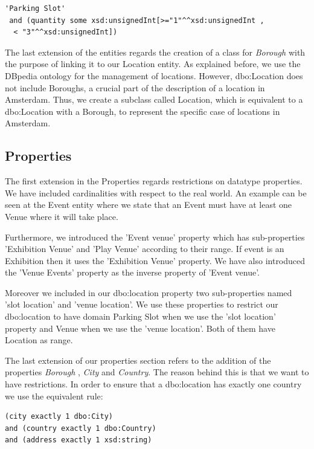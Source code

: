 \documentclass[runningheads,a4paper]{../../StyleFiles/llncs}
\begin{document}
\begin{lstlisting}[captionpos=b, caption=Definition of Small Slot a subclass of Parking Slot, label=lst:owl, basicstyle=\ttfamily\small,frame=bt,showstringspaces=false]
'Parking Slot' 
 and (quantity some xsd:unsignedInt[>="1"^^xsd:unsignedInt ,
  < "3"^^xsd:unsignedInt])
\end{lstlisting}

The last extension of the entities regards the creation of a class for \textit{Borough} with the purpose of linking it to our Location entity. As explained before, we use the DBpedia ontology for the management of locations. However, dbo:Location does not include Boroughs, a crucial part of the description of a  location in Amsterdam. Thus, we create a subclass called Location, which is equivalent to a dbo:Location with a Borough, to represent the specific case of locations in Amsterdam.

\subsection{Properties}

The first extension in the Properties regards restrictions on datatype properties. We have included cardinalities with respect to the real world. An example can be seen at the Event entity where we state that an Event must have at least one Venue where it will take place.

Furthermore, we introduced the 'Event venue' property which has sub-properties 'Exhibition Venue' and 'Play Venue' according to their range. If event is an Exhibition then it uses the 'Exhibition Venue' property. We have also introduced the 'Venue Events' property as the inverse property of 'Event venue'. 

Moreover we included in our dbo:location property two sub-properties named 'slot location' and 'venue location'. We use these properties to restrict our dbo:location to have domain Parking Slot when we use the 'slot location' property and Venue when we use the 'venue location'. Both of them have Location as range.

The last extension of our properties section refers to the addition of the properties \textit{Borough} , \textit{City} and \textit{Country}. The reason behind this is that we want to have restrictions. In order to ensure that a dbo:location has exactly one country we use the equivalent rule: \\

\begin{lstlisting}[captionpos=b, title=Class equivalent to dbo:Location with the use of our subproperties, label=lst:owl, basicstyle=\ttfamily\small,frame=bt]
(city exactly 1 dbo:City) 
and (country exactly 1 dbo:Country) 
and (address exactly 1 xsd:string)
\end{lstlisting}
\end{document}
